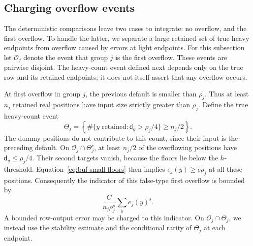 \subsection{Charging overflow events}

The deterministic comparisons leave two cases to integrate: no overflow,
and the first overflow.  To handle the latter, we separate a large retained
set of true heavy endpoints from overflow caused by errors at light
endpoints.
For this subsection let $\mathcal O_j$ denote the event that group $j$
is the first overflow.  These events are pairwise disjoint.  The
heavy-count event defined next depends only on the true row and its
retained endpoints; it does not itself assert that any overflow occurs.

At first overflow in group $j$, the previous default is smaller than
$\rho_j$.  Thus at least $n_j$ retained real positions have input size
strictly greater than $\rho_j$.  Define the true heavy-count event
\[
 \Theta_j=\left\{\#\{y\text{ retained}:\mathsf{d}_y>\rho_j/4\}\geq n_j/2\right\}.
\]
The dummy positions do not contribute to this count, since their input
is the preceding default.  On $\mathcal O_j\cap\Theta_j^c$, at least
$n_j/2$ of the overflowing positions have
$\mathsf{d}_y\leq\rho_j/4$.  Their second targets vanish, because the floors lie
below the $h$-threshold.  Equation~\eqref{eq:buf-small-floors} then implies
$e_j(y)\geq c\rho_j$ at all these positions.  Consequently the indicator
of this false-type first overflow is bounded by
\begin{equation}
 \frac{C}{n_j\rho_j^s}\sum_y e_j(y)^s.
 \label{eq:buf-false-charge}
\end{equation}
A bounded row-output error may be charged to this indicator.
On $\mathcal O_j\cap\Theta_j$, we instead use the stability estimate
and the conditional rarity of $\Theta_j$ at each endpoint.

